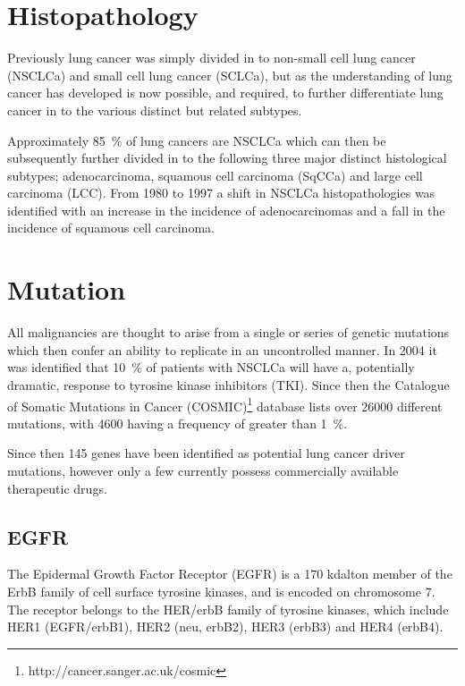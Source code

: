 \section{Histopathology}
Previously lung cancer was simply divided in to non-small cell lung cancer (NSCLCa) and small cell lung cancer (SCLCa), but as the understanding of lung cancer has developed is now possible, and required, to further differentiate lung cancer in to the various distinct but related subtypes.

Approximately 85~\% of lung cancers are NSCLCa\supercite{Herbst:2008fv} which can then be subsequently further divided in to the following three major distinct histological subtypes\supercite{Travis:2004ti}; adenocarcinoma, squamous cell carcinoma (SqCCa) and large cell carcinoma (LCC). From 1980 to 1997 a shift in NSCLCa histopathologies was identified with an increase in the incidence of adenocarcinomas and a fall in the incidence of squamous cell carcinoma\supercite{Devesa:2005jw}. 

\section{Mutation}
All malignancies are thought to arise from a single or series of genetic mutations which then confer an ability to replicate in an uncontrolled manner. 
In 2004 it was identified that 10~\% of patients with NSCLCa will have a, potentially dramatic, response to tyrosine kinase inhibitors (TKI)\supercite{Lynch:2004ii}. Since then the Catalogue of Somatic Mutations in Cancer (COSMIC)\footnote{http://cancer.sanger.ac.uk/cosmic} database\supercite{Forbes:2015gp} lists over 26000 different mutations, with 4600 having a frequency of greater than 1~\%. 

Since then 145 genes have been identified as potential lung cancer driver mutations\supercite{Chen:2013kz}, however only a few currently possess commercially available therapeutic drugs. 

\subsection{EGFR}

The Epidermal Growth Factor Receptor (EGFR) is a 170 kdalton member of the ErbB family of cell surface tyrosine kinases\supercite{Cadranel:2013fl}, and is encoded on chromosome 7. The receptor belongs to the HER/erbB  family of tyrosine kinases, which include HER1 (EGFR/erbB1), HER2 (neu, erbB2), HER3 (erbB3) and HER4 (erbB4)\supercite{daCunhaSantos:2011jb}. 

